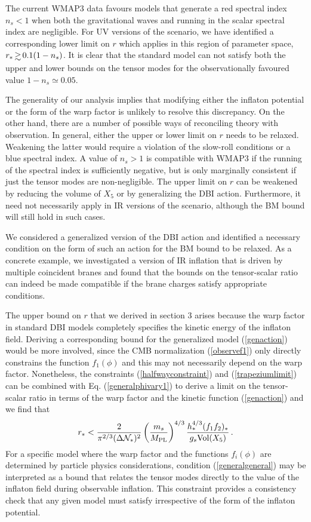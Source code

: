The current WMAP3 data 
favours models that generate a red spectral index $n_s<1$
when both the gravitational waves and running in the scalar 
spectral index are negligible. For UV versions of the scenario, 
we have identified a corresponding 
lower limit on $r$ which applies in this region of 
parameter space, $r_* \, \gsim \, 0.1 (1-n_s)$. It is clear that 
the standard model 
can not satisfy both the upper and lower bounds 
on the tensor modes for the observationally favoured value 
$1-n_s \simeq 0.05$.

The generality of our 
analysis implies that modifying either the inflaton potential 
or the form of the warp factor is unlikely to resolve this discrepancy. 
On the other hand, there are a number of possible ways of reconciling  
theory with observation. In general, 
either the upper or lower limit on $r$ needs to be relaxed. 
Weakening the latter would require a violation of the slow-roll 
conditions or a blue spectral index. 
A value of $n_s >1$ is compatible with WMAP3 if the running of the 
spectral index 
is sufficiently negative, but is only marginally
consistent if just the tensor modes are non-negligible.  The 
upper limit on $r$ can be weakened by reducing 
the volume of $X_5$ or 
by generalizing the DBI action. Furthermore, it need not necessarily 
apply in IR versions of the scenario, although the BM bound will still hold
in such cases. 

We considered a generalized version of the 
DBI action and identified a necessary condition on the form of such  
an action for the BM bound to be relaxed.
As a concrete example, 
we investigated a version of IR inflation that is driven by 
multiple coincident branes and found that  
the bounds on the tensor-scalar ratio can indeed 
be made compatible if the brane charges satisfy appropriate 
conditions.   

The upper bound on $r$ that we derived in section 3 arises 
because the warp factor in standard DBI models 
completely specifies the kinetic 
energy of the inflaton field. Deriving a corresponding bound for 
the generalized model (\ref{genaction}) would be more involved, 
since the CMB normalization (\ref{observef1}) only 
directly constrains the function 
$f_1 (\phi )$ and this may not necessarily depend on the warp factor. 
Nonetheless, the constraints (\ref{halfwayconstraint}) and
(\ref{trapeziumlimit}) can be 
combined with Eq. (\ref{generalphivary1}) to derive a limit 
on the tensor-scalar ratio in terms of the warp factor and the 
kinetic function (\ref{genaction}) and we find that  
\begin{equation}
\label{generalgeneral}
r_* < \frac{2}{\pi^{2/3} ( \Delta \mathcal{N}_*)^2}
\left( \frac{m_s}{M_{\mathrm{PL}}} \right)^{4/3} 
\frac{h_*^{4/3} (f_1f_2)_*}{g_s\mathrm{Vol}(X_5)}  \,.
\end{equation}
For a specific model where the warp factor and 
the functions $f_i (\phi )$ are determined by particle 
physics considerations,   
condition (\ref{generalgeneral}) 
may be interpreted as a bound that relates 
the tensor modes directly to the value of the inflaton field during observable 
inflation. This constraint provides a consistency 
check that any given model must satisfy 
irrespective of the form of the inflaton potential. 

